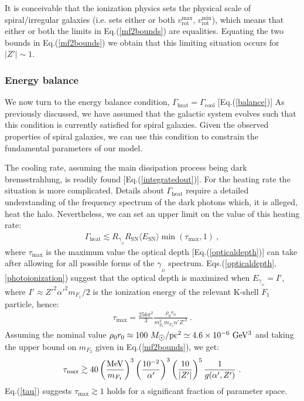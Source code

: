 \documentclass[12pt]{article}
\begin{document}
{{It is conceivable that the ionization physics sets the physical scale of spiral/irregular galaxies (i.e. sets either or both $v _{\text{rot}} ^{\max}$, $v _{\text{rot}} ^{\min}$), which means that either or both the limits in Eq.(\ref{mf2bounds}) are equalities. Equating the two bounds in Eq.(\ref{mf2bounds}) we obtain that this limiting situation occurs for $|Z'| \sim 1$.

\subsubsection{Energy balance}

We now turn to the energy balance condition, $\Gamma _{\text{heat}} = \Gamma _{\text{cool}}$ [Eq.(\ref{balance})] As previously discussed, we have assumed that the galactic system evolves such that this condition is currently satisfied for spiral galaxies. Given the observed properties of spiral galaxies, we can use this condition to constrain the fundamental parameters of our model.

The cooling rate, assuming the main dissipation process being dark bremsstrahlung, is readily found [Eq.(\ref{integratedout})]. For the heating rate the situation is more complicated. Details about $\Gamma _{\text{heat}}$ require a detailed understanding of the frequency spectrum of the dark photons which, it is alleged, heat the halo. Nevertheless, we can set an upper limit on the value of this heating rate:
%
\begin{eqnarray}
\Gamma _{\text{heat}} \lesssim R _{\gamma _{_D}}R _{\text{SN}}\langle E _{\text{SN}} \rangle \min(\tau _{\max},1) \ ,
\label{gammaheat}
\end{eqnarray}
%
where $\tau _{\max}$ is the maximum value the optical depth [Eq.(\ref{opticaldepth})] can take after allowing for all possible forms of the $\gamma _{_D}$ spectrum. Eqs.(\ref{opticaldepth},\ref{photoionization}) suggest that the optical depth is maximized when $E _{\gamma _{_D}} = I'$, where $I' \approx {Z'} ^2{\alpha '} ^2m _{F_1}/2$ is the ionization energy of the relevant K-shell $F_1$ particle, hence:
%
\begin{eqnarray}
\tau _{\max} = \frac{256\pi ^2}{3}\frac{\rho _0r _0}{m _{F_1} ^2m _{F_2}\alpha '{Z'} ^2} \ .
\label{taumax}
\end{eqnarray}
%
Assuming the nominal value $\rho _0r _0 \approx 100 \ M _{\astrosun}/{\rm pc ^2} \simeq 4.6 \times 10 ^{-6} \ {\rm GeV ^3}$ and taking the upper bound on $m _{F_2}$ given in Eq.(\ref{mf2bounds}), we get:
%
\begin{eqnarray}
\tau _{\max} \gtrsim 40 \left ( \frac{\rm MeV}{m _{F_1}} \right ) ^3\left ( \frac{10 ^{-2}}{\alpha '} \right ) ^3\left ( \frac{10}{|Z'|} \right ) ^5\frac{1}{g(\alpha ',Z')} \ .
\label{tau}
\end{eqnarray}
%
Eq.(\ref{tau}) suggests $\tau _{\max}\gtrsim 1$ holds for a significant fraction of parameter space.

}}
\end{document}
